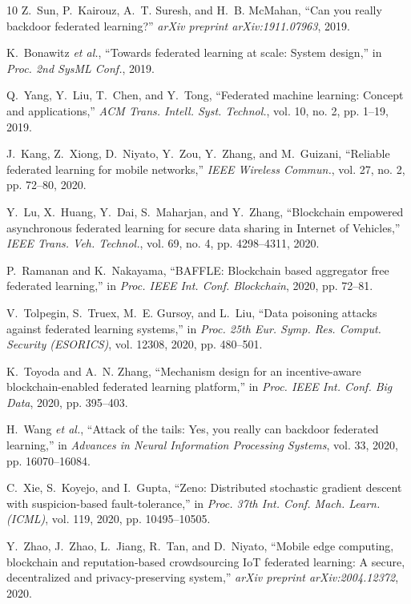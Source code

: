 \documentclass{ieeeaccess}
\begin{document}
\begin{thebibliography}{10}
Z.~Sun, P.~Kairouz, A.~T. Suresh, and H.~B. McMahan,
``Can you really backdoor federated learning?''
\emph{arXiv preprint arXiv:1911.07963}, 2019.

K.~Bonawitz \emph{et al.},
``Towards federated learning at scale: System design,''
in \emph{Proc. 2nd SysML Conf.}, 2019.

Q.~Yang, Y.~Liu, T.~Chen, and Y.~Tong,
``Federated machine learning: Concept and applications,''
\emph{ACM Trans. Intell. Syst. Technol.}, vol. 10, no. 2, pp. 1--19, 2019.

J.~Kang, Z.~Xiong, D.~Niyato, Y.~Zou, Y.~Zhang, and M.~Guizani,
``Reliable federated learning for mobile networks,''
\emph{IEEE Wireless Commun.}, vol. 27, no. 2, pp. 72--80, 2020.

Y.~Lu, X.~Huang, Y.~Dai, S.~Maharjan, and Y.~Zhang,
``Blockchain empowered asynchronous federated learning for secure data sharing in Internet of Vehicles,''
\emph{IEEE Trans. Veh. Technol.}, vol. 69, no. 4, pp. 4298--4311, 2020.

P.~Ramanan and K.~Nakayama,
``BAFFLE: Blockchain based aggregator free federated learning,''
in \emph{Proc. IEEE Int. Conf. Blockchain}, 2020, pp. 72--81.

V.~Tolpegin, S.~Truex, M.~E. Gursoy, and L.~Liu,
``Data poisoning attacks against federated learning systems,''
in \emph{Proc. 25th Eur. Symp. Res. Comput. Security (ESORICS)}, vol. 12308, 2020, pp. 480--501.

K.~Toyoda and A.~N. Zhang,
``Mechanism design for an incentive-aware blockchain-enabled federated learning platform,''
in \emph{Proc. IEEE Int. Conf. Big Data}, 2020, pp. 395--403.

H.~Wang \emph{et al.},
``Attack of the tails: Yes, you really can backdoor federated learning,''
in \emph{Advances in Neural Information Processing Systems}, vol. 33, 2020, pp. 16070--16084.

C.~Xie, S.~Koyejo, and I.~Gupta,
``Zeno: Distributed stochastic gradient descent with suspicion-based fault-tolerance,''
in \emph{Proc. 37th Int. Conf. Mach. Learn. (ICML)}, vol. 119, 2020, pp. 10495--10505.

Y.~Zhao, J.~Zhao, L.~Jiang, R.~Tan, and D.~Niyato,
``Mobile edge computing, blockchain and reputation-based crowdsourcing IoT federated learning: A secure, decentralized and privacy-preserving system,''
\emph{arXiv preprint arXiv:2004.12372}, 2020.


\end{thebibliography}
\end{document}

